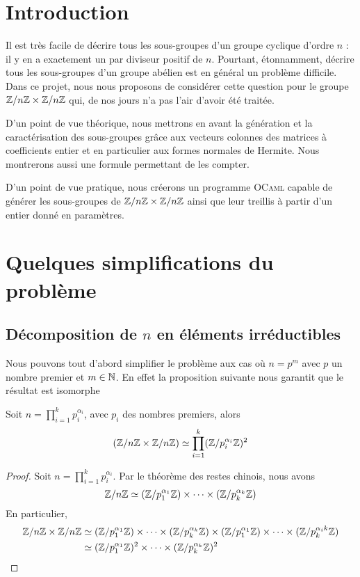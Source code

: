 \documentclass[12pt]{article}
\newcommand{\ZnZ}{\Z/n\Z}
\newcommand{\ZZ}{\ZnZ \x \ZnZ}
\begin{document}

\hfill
\thispagestyle{empty}
\newpage
\tableofcontents
\newpage
\section{Introduction}
Il est très facile de décrire tous les sous-groupes d'un groupe cyclique
d'ordre $n$ : il y en a exactement un par diviseur positif de $n$.
Pourtant, étonnamment, décrire tous les sous-groupes d'un groupe abélien
est en général un problème difficile.
Dans ce projet, nous nous proposons de considérer cette question pour le groupe $\ZZ$ qui,
de nos jours n'a pas l'air d'avoir été traitée.

D'un point de vue théorique, nous mettrons en avant la génération et la
caractérisation des sous-groupes grâce aux vecteurs colonnes des matrices à coefficients entier et en particulier
aux formes normales de Hermite. Nous montrerons aussi une formule permettant de les compter.

D'un point de vue pratique, nous créerons un programme \textsc{OCaml} capable de générer les
sous-groupes de $\ZZ$ ainsi que leur treillis à partir d'un entier donné en paramètres.

\newpage
\section{Quelques simplifications du problème}
\subsection{Décomposition de $n$ en éléments irréductibles}\label{theoreme_chinois}

Nous pouvons tout d'abord simplifier le problème aux cas où $n = p^m$ avec $p$ un nombre premier
et $m \in \mathbb N$. En effet la proposition suivante nous garantit que le résultat est isomorphe
\begin{proposition}
	Soit $n = \prod\limits_{i = 1}^k p_i^{\alpha_i}$, avec $p_i$ des nombres premiers, alors
	$$(\ZZ) \isom \prod_{i = 1}^k(\Z/p_i^{\alpha_i}\Z)^2$$
\end{proposition}

\begin{proof}
	Soit $n = \prod\limits_{i = 1}^k p_i^{\alpha_i}$. Par le théorème des restes chinois, nous avons
	$$ \ZnZ \isom (\Z/p_1^{\alpha_1}\Z) \x \cdots \x (\Z/p_k^{\alpha_k}\Z)$$
	En particulier,
	\begin{equation*}
		\begin{split}
			\ZZ & \isom
			(\Z/p_1^{\alpha_1}\Z) \x \cdots \x (\Z/p_k^{\alpha_k}\Z) \x (\Z/p_1^{\alpha_1}\Z)%
			\x \cdots \x (\Z/p_k^{\alpha_ik}\Z)\\
			& \isom (\Z/p_1^{\alpha_1}\Z)^2 \x \cdots \x (\Z/p_k^{\alpha_k}\Z)^2
		\end{split}
	\end{equation*}
\end{proof}
\end{document}
